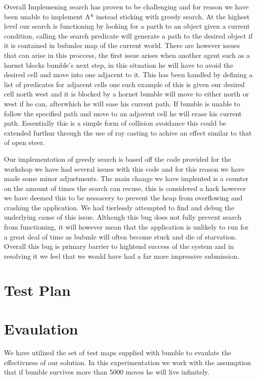 \documentclass[a4paper,oneside]{report}
\begin{document}
Overall Implemening search has proven to be challenging and for reason we have been unable to implement A* instead sticking with greedy search.  At the highest level our search is functioning by looking for a parth to an object given a current condition, calling the search predicate will generate a path to the desired object if it is contained in bubmles map of the current world.  There are however issues that can arise in this proccess, the first issue arises when another agent such as a hornet blocks bumble's next step, in this situation he will have to avoid the desired cell and move into one adjacent to it.  This has been handled by defining a list of predicates for adjacent cells one such example of this is given our desired cell north west and it is blocked by a hornet bumble will move to either north or west if he can, afterwhich he will ease his current path.  If bumble is unable to follow the specified path and move to an adjavent cell he will erase his current path. Essentially this is a simple form of collision avoidance this could be extended furthur through the use of ray casting to achive an effect similar to that of open steer. 

Our implementation of greedy search is based off the code provided for the workshop we have had several issues with this code and for this reason we have made some minor adjustments. The main change we have implented is a counter on the amount of times the search can recuse, this is considered a hack however we have deemed this to be nessacery to prevent the heap from overflowing and crashing the application. We had tierlessly attempted to find and debug the underlying cause of this issue. Although this bug does not fully prevent search from functioning, it will however mean that the application is unlikely to run for a great deal of time as bubmle will often become stuck and die of starvation.  Overall this bug is primary barrier to hightend success of the system and in resolving it we feel that we would have had a far more impressive submission. 

	

\section{Test Plan}


\section{Evaulation}

	We have utilized the set of test maps supplied with bumble to evaulate the effectivness of our solution. In this experimentation we work with the assumption that if bumble survives more than 5000 moves he will live infinitely.
	
\end{document}
